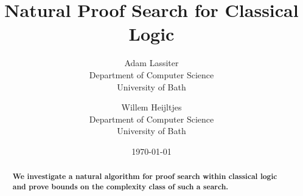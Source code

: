 \documentclass{article}
\title{Natural Proof Search for Classical Logic}
\author{Adam Lassiter\\Department of Computer Science\\University of Bath \and Willem Heijltjes\\Department of Computer Science\\University of Bath}
\date{\today}
\theoremstyle{indented}
\begin{document}
    \maketitle
    \begin{abstract}
        \textbf{We investigate a natural algorithm for proof search within classical logic and prove bounds on the complexity class of such a search.}
    \end{abstract}

    
 
    

    

    
    
\end{document}
